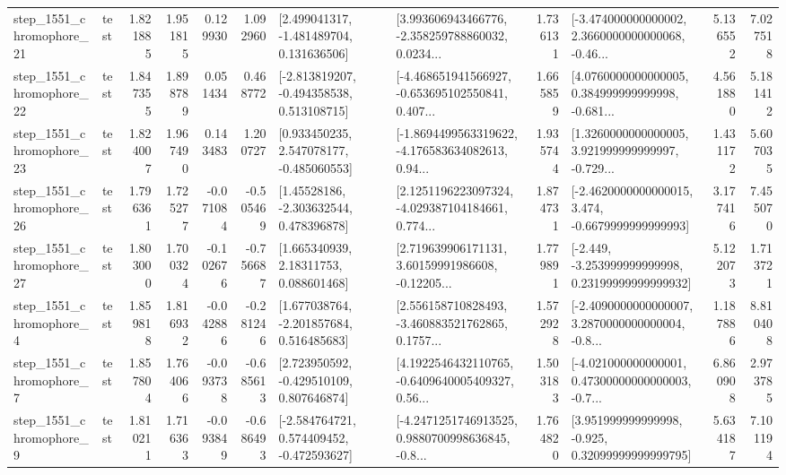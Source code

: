 \begin{tabular}{llrrrrllrlrr}
 step\_1551\_chromophore\_21 &      test &      1.821885 &    1.951815 &      0.129930 &  1.092960 &    [2.499041317, -1.481489704, 0.131636506] &  [3.993606943466776, -2.358259788860032, 0.0234... &       1.736131 &  [-3.474000000000002, 2.3660000000000068, -0.46... &            5.136552 &          7.027518 \\
 step\_1551\_chromophore\_22 &      test &      1.847355 &    1.898789 &      0.051434 &  0.468772 &   [-2.813819207, -0.494358538, 0.513108715] &  [-4.468651941566927, -0.653695102550841, 0.407... &       1.665859 &  [4.0760000000000005, 0.384999999999998, -0.681... &            4.561880 &          5.181412 \\
 step\_1551\_chromophore\_23 &      test &      1.824007 &    1.967490 &      0.143483 &  1.200727 &    [0.933450235, 2.547078177, -0.485060553] &  [-1.8694499563319622, -4.176583634082613, 0.94... &       1.935744 &  [1.3260000000000005, 3.921999999999997, -0.729... &            1.431172 &          5.607035 \\
 step\_1551\_chromophore\_26 &      test &      1.796361 &    1.725277 &     -0.071084 & -0.505469 &     [1.45528186, -2.303632544, 0.478396878] &  [2.1251196223097324, -4.029387104184661, 0.774... &       1.874731 &  [-2.4620000000000015, 3.474, -0.6679999999999993] &            3.177416 &          7.455070 \\
 step\_1551\_chromophore\_27 &      test &      1.803000 &    1.700324 &     -0.102676 & -0.756687 &      [1.665340939, 2.18311753, 0.088601468] &  [2.719639906171131, 3.60159991986608, -0.12205... &       1.779891 &  [-2.449, -3.253999999999998, 0.23199999999999932] &            5.122073 &          1.713721 \\
  step\_1551\_chromophore\_4 &      test &      1.859818 &    1.816932 &     -0.042886 & -0.281246 &    [1.677038764, -2.201857684, 0.516485683] &  [2.556158710828493, -3.460883521762865, 0.1757... &       1.572928 &  [-2.4090000000000007, 3.2870000000000004, -0.8... &            1.187886 &          8.810408 \\
  step\_1551\_chromophore\_7 &      test &      1.857804 &    1.764066 &     -0.093738 & -0.685613 &    [2.723950592, -0.429510109, 0.807646874] &  [4.1922546432110765, -0.6409640005409327, 0.56... &       1.503183 &  [-4.021000000000001, 0.47300000000000003, -0.7... &            6.860908 &          2.973785 \\
  step\_1551\_chromophore\_9 &      test &      1.810211 &    1.716363 &     -0.093849 & -0.686493 &   [-2.584764721, 0.574409452, -0.472593627] &  [-4.2471251746913525, 0.9880700998636845, -0.8... &       1.764820 &   [3.951999999999998, -0.925, 0.32099999999999795] &            5.634187 &          7.101194 \\

\end{tabular}
